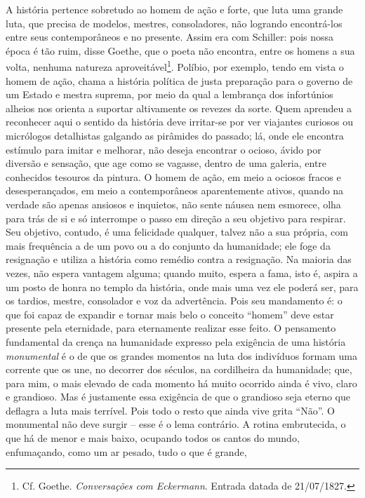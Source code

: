 A história pertence sobretudo ao homem de ação e forte, que luta uma
grande luta, que precisa de modelos, mestres, consoladores, não logrando
encontrá-los entre seus contemporâneos e no presente. Assim era com
Schiller: pois nossa época é tão ruim, disse Goethe, que o poeta não
encontra, entre os homens a sua volta, nenhuma natureza
aproveitável\footnote{Cf. Goethe. \emph{Conversações com Eckermann}.
  Entrada datada de 21/07/1827.}. Políbio, por exemplo, tendo em vista o
homem de ação, chama a história política de justa preparação para o
governo de um Estado e mestra suprema, por meio da qual a lembrança
dos infortúnios alheios nos orienta a suportar altivamente os revezes da
sorte. Quem aprendeu a reconhecer aqui o sentido da história deve
irritar-se por ver viajantes curiosos ou micrólogos detalhistas galgando
as pirâmides do passado; lá, onde ele encontra estímulo para imitar e
melhorar, não deseja encontrar o ocioso, ávido por diversão e sensação,
que age como se vagasse, dentro de uma galeria, entre conhecidos
tesouros da pintura. O homem de ação, em meio a ociosos fracos e
desesperançados, em meio a contemporâneos aparentemente ativos, quando
na verdade são apenas ansiosos e inquietos, não sente náusea nem
esmorece, olha para trás de si e só interrompe o passo em direção a seu
objetivo para respirar. Seu objetivo, contudo, é uma felicidade
qualquer, talvez não a sua própria, com mais frequência a de um povo ou
a do conjunto da humanidade; ele foge da resignação e utiliza a história
como remédio contra a resignação. Na maioria das vezes, não espera
vantagem alguma; quando muito, espera a fama, isto é, aspira a um posto
de honra no templo da história, onde mais uma vez ele poderá ser, para
os tardios, mestre, consolador e voz da advertência. Pois seu mandamento
é: o que foi capaz de expandir e tornar mais belo o conceito ``homem''
deve estar presente pela eternidade, para eternamente realizar esse
feito. O pensamento fundamental da crença na humanidade expresso pela
exigência de uma história \emph{monumental} é o de que os grandes
momentos na luta dos indivíduos formam uma corrente que os une, no
decorrer dos séculos, na cordilheira da humanidade; que, para mim, o
mais elevado de cada momento há muito ocorrido ainda é vivo, claro e
grandioso. Mas é justamente essa exigência de que o grandioso seja
eterno que deflagra a luta mais terrível. Pois todo o resto que ainda
vive grita ``Não''. O monumental não deve surgir -- esse é o lema contrário.
A rotina embrutecida, o que há de menor e mais baixo, ocupando todos os
cantos do mundo, enfumaçando, como um ar pesado, tudo o que é grande,
